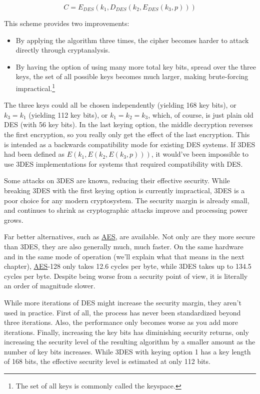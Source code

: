 \documentclass[11pt,ebook,table,dvipsnames]{memoir}
\begin{document}
\begin{equation}
C = E_{DES}(k_1, D_{DES}(k_2, E_{DES}(k_3, p)))
\end{equation}

This scheme provides two improvements:

\begin{itemize}
\item By applying the algorithm three times, the cipher becomes harder to
attack directly through cryptanalysis.
\item By having the option of using many more total key bits, spread over
the three keys, the set of all possible keys becomes much larger,
making brute-forcing impractical.\footnote{The set of all keys is
   commonly called the keyspace.}
\end{itemize}

The three keys could all be chosen independently (yielding 168 key
bits), or $k_3 = k_1$ (yielding 112 key bits), or $k_1 = k_2 = k_3$,
which, of course, is just plain old DES (with 56 key bits). In the
last keying option, the middle decryption reverses the first
encryption, so you really only get the effect of the last encryption.
This is intended as a backwards compatibility mode for existing DES
systems. If 3DES had been defined as $E(k_1, E(k_2, E(k_3, p)))$, it
would've been impossible to use 3DES implementations for systems that
required compatibility with DES.

Some attacks on 3DES are known, reducing their effective security.
While breaking 3DES with the first keying option is currently
impractical, 3DES is a poor choice for any modern cryptosystem. The
security margin is already small, and continues to shrink as
cryptographic attacks improve and processing power grows.

Far better alternatives, such as \hyperref[AES]{AES}, are available. Not only are they
more secure than 3DES, they are also generally much, much faster. On
the same hardware and in the same \gls{mode of operation} (we'll
explain what that means in the next chapter), \hyperref[AES]{AES}-128 only takes 12.6
cycles per byte, while 3DES takes up to 134.5 cycles per byte.
\cite{cryptopp:bench} Despite being worse from a security point of
view, it is literally an order of magnitude slower.

While more iterations of DES might increase the security margin, they
aren't used in practice. First of all, the process has never been
standardized beyond three iterations. Also, the performance only
becomes worse as you add more iterations. Finally, increasing the key
bits has diminishing security returns, only increasing the security
level of the resulting algorithm by a smaller amount as the number of
key bits increases. While 3DES with keying option 1 has a key length
of 168 bits, the effective security level is estimated at only 112
bits.
\end{document}
